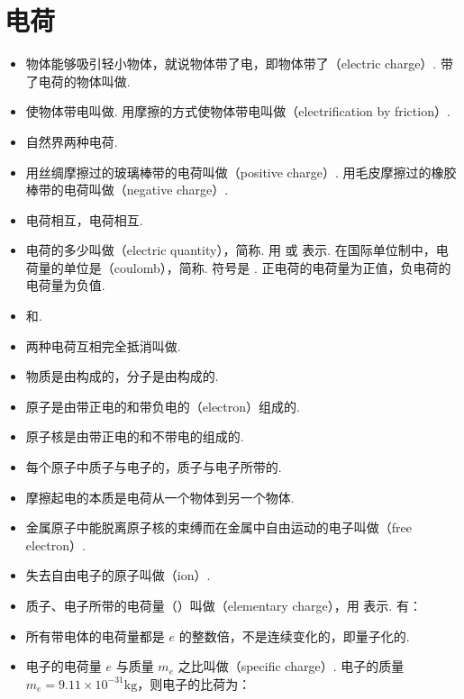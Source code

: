\newpage
\section{电荷}

\vspace{10pt}
\begin{itemize}
\item 物体能够吸引轻小物体，就说物体带了电，即物体带了（electric charge）. 带了电荷的物体叫做.
\item 使物体带电叫做. 用摩擦的方式使物体带电叫做（electrification by friction）.
\item 自然界两种电荷.
\item 用丝绸摩擦过的玻璃棒带的电荷叫做（positive charge）. 用毛皮摩擦过的橡胶棒带的电荷叫做（negative charge）.
\item {}电荷相互，电荷相互.
\item 电荷的多少叫做（electric quantity），简称. 用  或  表示. 在国际单位制中，电荷量的单位是（coulomb），简称. 符号是 . 正电荷的电荷量为正值，负电荷的电荷量为负值.
\item {}和.
\item 两种电荷互相完全抵消叫做.
\item 物质是由构成的，分子是由构成的.
\item 原子是由带正电的和带负电的（electron）组成的.
\item 原子核是由带正电的和不带电的组成的.
\item 每个原子中质子与电子的，质子与电子所带的.
\item 摩擦起电的本质是电荷从一个物体到另一个物体.
\item 金属原子中能脱离原子核的束缚而在金属中自由运动的电子叫做（free electron）.
\item 失去自由电子的原子叫做（ion）.
\item 质子、电子所带的电荷量（）叫做（elementary charge），用  表示. 有：
\item 所有带电体的电荷量都是 $e$ 的整数倍，不是连续变化的，即量子化的.
\item 电子的电荷量 $e$ 与质量 $m_e$ 之比叫做（specific charge）. 电子的质量 $m_e=9.11\times10^{-31}\text{kg}$，则电子的比荷为：

\end{itemize}
